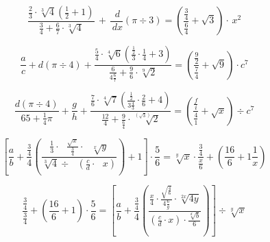 \documentclass[aspectratio=169]{beamer}
\begin{document}

\begin{frame}
\fontsize{60pt}{60pt}

\[\frac{\frac{2}{3}\cdot\sqrt[3]{4} \left(\frac{1}{2}+1 \right)}{\frac{3}{4}+ \frac{6}{7}\cdot\sqrt[3]{4}}\,+\, \frac{\,d}{\,dx}(\pi\div 3)=\left (\frac{\frac{3}{4}}{\frac{6}{4}}+\sqrt{3}\right)\cdot \, x^2\]

\end{frame}


\begin{frame}
\fontsize{60pt}{60pt}

       $$ \frac{a}{c} + d(\pi \div 4) + \frac{\frac{5}{4} \cdot \sqrt[4]{6} \left(\frac{\frac{1}{2}}{3} \cdot \frac{1}{4} + 3 \right)}{\frac{6}{4 \frac{6}{7}} + \frac{9}{6} \cdot \sqrt[9]{2}}
        = \left(\frac{\frac{9}{2}}{\frac{7}{4}} + \sqrt{9} \right) \cdot c^7$$

\end{frame}


\begin{frame}
\fontsize{60pt}{60pt}

$$ \frac{d(\pi \div 4)}{65 + \frac{1}{4} \pi } + \frac{g}{h} + \frac{\frac{7}{6} \cdot \sqrt[4]{7} \left(  \frac{\frac{1}{2}}{3\frac{4}{3}} \cdot \frac{2}{6} + 4  \right) }{\frac{12}{4} + \frac{9}{\frac{6}{4}} \cdot \sqrt[(\sqrt{3})]{2} } = \left(  \frac{\frac{f}{i}}{\frac{4}{1}} + \sqrt{x} \right) \div c^{7} $$


\end{frame}


\begin{frame}
\fontsize{60pt}{60pt}

$$
\left[\frac{a}{b}+\frac{\frac{3}{4}}{4}\left(\frac{\frac{1}{3}\cdot \:\:\:\frac{\sqrt{x}}{\frac{3}{4}}\cdot \:\:\:\sqrt[x]{y}}{\sqrt[3]{4}\div \:\:\:\left(\frac{c}{d}\cdot \:\:\:x\right)}\right)+1\right]\cdot \frac{5}{6}=\sqrt[y]{x}\cdot \frac{\frac{3}{4}}{\frac{x}{6}}+\left(\frac{16}{6}+1\frac{1}{x}\right)
$$

\end{frame}


\begin{frame}
\fontsize{60pt}{60pt}

$$\frac{\frac{3}{4}} {\frac{3}{4}} + \left(\frac{16}{6}+1\right)\cdot \frac{5}{6}=
\left [\frac{a}{b}+\frac{\frac{3}{4}}{4}
\left ( \frac{\frac{x}{4}\cdot \frac{\sqrt{\frac{4}{6}}}{4\frac{6}{g}}\cdot \sqrt[2x]{4y}}
{\left ( \frac{c}{d}\cdot x \right )\cdot \frac{\sqrt[d]{b}}{6}} \right ) \right]\div \sqrt[y]{x}$$

\end{frame}
\end{document}
